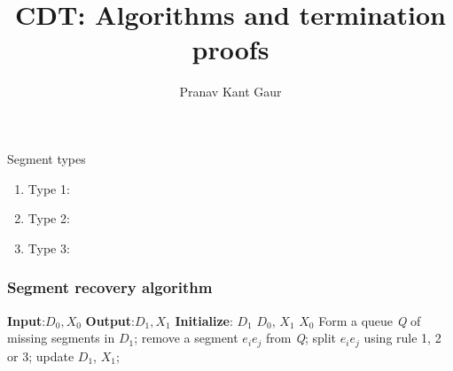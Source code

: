 \documentclass{beamer}
\title[CDT]{CDT: Algorithms and termination proofs}
\author{Pranav Kant Gaur}
\institute[BARC, India]{Computer Division, \newline Bhabha Atomic Research Centre, Mumbai, India}
\date{}
\begin{document}
\begin{frame}
  \titlepage
\end{frame}

\begin{frame}{Segment types}
\begin{enumerate}
    \item Type 1:
    \item Type 2:
    \item Type 3:
\end{enumerate}
\end{frame}


\begin{frame}
\frametitle{Segment recovery algorithm}
\begin{algorithm}[H]
\caption{Segment recovery}
\begin{algorithmic}[1]
	\State \textbf{Input}:$D_0, X_0$
	\State \textbf{Output}:$D_1, X_1$
	\State \textbf{Initialize}:
	\State $D_1$ \gets $D_0$, $X_1$ \gets $X_0$
	\Repeat
	\State Form a queue \textit{Q} of missing segments in $D_1$;
	\State remove a segment $e_{i}e_{j}$ from \textit{Q};
	\State split $e_{i}e_{j}$ using rule 1, 2 or 3;
	\State update $D_1$, $X_1$;
	\EndWhile
\EndProcedure
\end{algorithmic}
\end{algorithm}
\end{frame}
\end{document}
